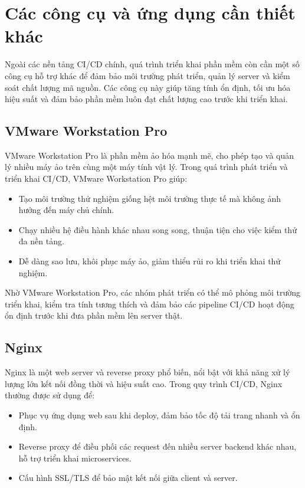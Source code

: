 \section{Các công cụ và ứng dụng cần thiết khác}

Ngoài các nền tảng CI/CD chính, quá trình triển khai phần mềm còn cần một số công cụ hỗ trợ khác để đảm bảo môi trường phát triển, quản lý server và kiểm soát chất lượng mã nguồn. Các công cụ này giúp tăng tính ổn định, tối ưu hóa hiệu suất và đảm bảo phần mềm luôn đạt chất lượng cao trước khi triển khai.

\subsection{VMware Workstation Pro}

VMware Workstation Pro là phần mềm ảo hóa mạnh mẽ, cho phép tạo và quản lý nhiều máy ảo trên cùng một máy tính vật lý. Trong quá trình phát triển và triển khai CI/CD, VMware Workstation Pro giúp: 
\begin{itemize} 
	\item Tạo môi trường thử nghiệm giống hệt môi trường thực tế mà không ảnh hưởng đến máy chủ chính. 
	\item Chạy nhiều hệ điều hành khác nhau song song, thuận tiện cho việc kiểm thử đa nền tảng. 
	\item Dễ dàng sao lưu, khôi phục máy ảo, giảm thiểu rủi ro khi triển khai thử nghiệm.
\end{itemize}

Nhờ VMware Workstation Pro, các nhóm phát triển có thể mô phỏng môi trường triển khai, kiểm tra tính tương thích và đảm bảo các pipeline CI/CD hoạt động ổn định trước khi đưa phần mềm lên server thật.

\subsection{Nginx}

Nginx là một web server và reverse proxy phổ biến, nổi bật với khả năng xử lý lượng lớn kết nối đồng thời và hiệu suất cao. Trong quy trình CI/CD, Nginx thường được sử dụng để: 
\begin{itemize} 
	\item Phục vụ ứng dụng web sau khi deploy, đảm bảo tốc độ tải trang nhanh và ổn định. 
	\item Reverse proxy để điều phối các request đến nhiều server backend khác nhau, hỗ trợ triển khai microservices. 
	\item Cấu hình SSL/TLS để bảo mật kết nối giữa client và server. 
\end{itemize}

